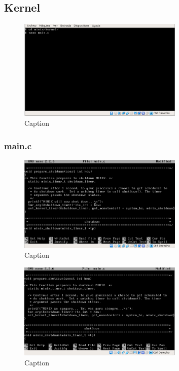 \documentclass[12pt]{scrartcl}
\begin{document}
\subsection{Kernel}
\begin{figure}[H]
  \centering
  \includegraphics[width=0.7\textwidth]{4.png}
  \caption{Caption}
\end{figure}

\subsubsection{main.c}
\begin{figure}[H]
  \centering
  \includegraphics[width=0.7\textwidth]{5.png}
  \caption{Caption}
\end{figure}
\begin{figure}[H]
  \centering
  \includegraphics[width=0.7\textwidth]{6.png}
  \caption{Caption}
\end{figure}
\end{document}
